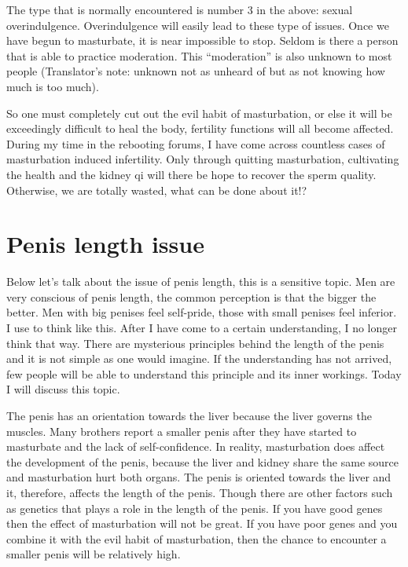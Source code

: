 \documentclass[
]{book}
\begin{document}
The type that is normally encountered is number 3 in the above: sexual overindulgence. Overindulgence will easily lead to these type of issues. Once we have begun to masturbate, it is near impossible to stop. Seldom is there a person that is able to practice moderation. This ``moderation'' is also unknown to most people (Translator's note: unknown not as unheard of but as not knowing how much is too much).

So one must completely cut out the evil habit of masturbation, or else it will be exceedingly difficult to heal the body, fertility functions will all become affected. During my time in the rebooting forums, I have come across countless cases of masturbation induced infertility. Only through quitting masturbation, cultivating the health and the kidney qi will there be hope to recover the sperm quality. Otherwise, we are totally wasted, what can be done about it!?

\hypertarget{penis-length-issue}{%
\section{Penis length issue}\label{penis-length-issue}}

Below let's talk about the issue of penis length, this is a sensitive topic. Men are very conscious of penis length, the common perception is that the bigger the better. Men with big penises feel self-pride, those with small penises feel inferior. I use to think like this. After I have come to a certain understanding, I no longer think that way. There are mysterious principles behind the length of the penis and it is not simple as one would imagine. If the understanding has not arrived, few people will be able to understand this principle and its inner workings. Today I will discuss this topic.

The penis has an orientation towards the liver because the liver governs the muscles. Many brothers report a smaller penis after they have started to masturbate and the lack of self-confidence. In reality, masturbation does affect the development of the penis, because the liver and kidney share the same source and masturbation hurt both organs. The penis is oriented towards the liver and it, therefore, affects the length of the penis. Though there are other factors such as genetics that plays a role in the length of the penis. If you have good genes then the effect of masturbation will not be great. If you have poor genes and you combine it with the evil habit of masturbation, then the chance to encounter a smaller penis will be relatively high.
\end{document}
